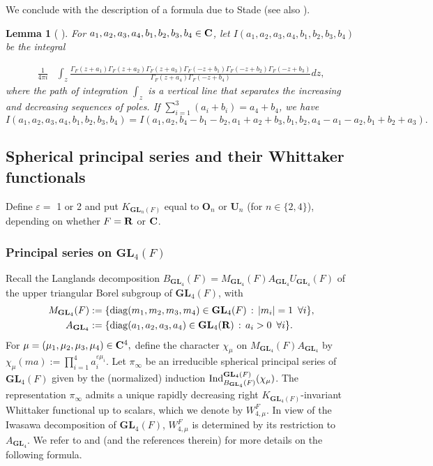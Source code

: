 \documentclass[11pt, reqno]{amsart}
\theoremstyle{plain}
\newtheorem{lemma}[theorem]{Lemma}
\theoremstyle{definition}
\theoremstyle{remark}
\theoremstyle{plain}
\def\C{{\bf C}}
\def\R{{\bf R}}
\def\epsilon{\varepsilon}
\def\GL{\mathbf{GL}}
\begin{document}
We conclude with the description of a formula due to Stade (see also \cite[Lemma 1.5]{IshiiMultivariate}).

\begin{lemma}[{ \cite[Lemma 2.1]{Stade}}]\label{StadeLemma}
    For $a_1,a_2,a_3,a_4,b_1,b_2,b_3,b_4 \in \C$, let $I(a_1,a_2,a_3,a_4,b_1,b_2,b_3,b_4)$ be the integral 
    
    \begin{align*}
        \frac{1}{4 \pi i} &\int_z \frac{\Gamma_F(z + a_1) \Gamma_F(z + a_2)\Gamma_F(z + a_3) \Gamma_F(-z + b_1) \Gamma_F(-z + b_2)\Gamma_F(-z + b_3)}{\Gamma_F(z + a_4 )\Gamma_F(-z + b_4)} dz,
    \end{align*}
    where the path of integration $\int_z$ is a vertical line that separates the increasing and decreasing sequences of poles. If $\sum_{i=1}^3 (a_i + b_i) = a_4 + b_4$, we have 
    $$ I(a_1,a_2,a_3,a_4,b_1,b_2,b_3,b_4) = I(a_1,a_2,b_4 - b_1 - b_2,a_1+a_2+b_3,b_1,b_2, a_4 - a_1 - a_2,b_1 + b_2 + a_3).$$
\end{lemma}

\subsection{Spherical principal series and their Whittaker functionals}\label{sec:SphWhittakerFormulae}


Define $\epsilon =$ 1 or 2 and put $K_{\GL_n(F)}$ equal to $\mathbf{O}_n$ or $\mathbf{U}_n$ (for $n \in \{2,4\}$), depending on whether $F = \R$ or  $\C$. 

\subsubsection{Principal series on $\GL_4(F)$}

Recall the Langlands decomposition $B_{\GL_4}(F) = M_{\GL_4}(F) A_{\GL_4} U_{\GL_4}(F)$ of the upper triangular Borel subgroup of $\GL_4(F)$, with \begin{align*}
    M_{\GL_4}(F)&:= \{{\rm diag}(m_1,m_2,m_3,m_4)\in \GL_4(F)\,:\, |m_i| = 1\,\,\, \forall i \}, \\
     A_{\GL_4} &:= \{{\rm diag}(a_1,a_2,a_3,a_4)\in \GL_4(\R)\,:\, a_i> 0 \,\,\, \forall i \}.
\end{align*} 
For $\mu=(\mu_1,\mu_2,\mu_3,\mu_4) \in \C^4,$ define the character $\chi_\mu$ on $M_{\GL_4}(F)A_{\GL_4}$ by $\chi_\mu(m a) := \prod_{i=1}^4 a_i^{\epsilon \mu_i}$. Let $\pi_\infty$ be an irreducible spherical principal series of $\GL_4(F)$ given by the (normalized) induction ${\rm Ind}_{B_{\GL_4}(F)}^{\GL_4(F)}(\chi_{\mu})$. The representation $\pi_\infty$ admits a unique rapidly decreasing right $K_{\GL_4(F)}$-invariant Whittaker functional up to scalars, which we denote by $W_{4,\mu}^F$. In view of the Iwasawa decomposition of $\GL_4(F)$, $W_{4,\mu}^F$ is determined by its restriction to $A_{\GL_4}$. We refer to \cite{IshiiStade} and \cite{IshiiMultivariate} (and the references therein) for more details on the following formula.
\end{document}
